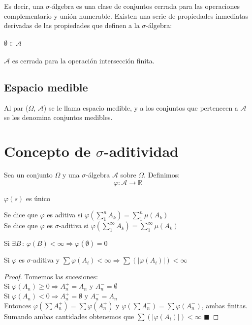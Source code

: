 \documentclass[12pt,a4paper]{book}
\newcommand*{\qed}{\hfill\ensuremath{\blacksquare}}
\begin{document}
Es decir, una $\sigma$-álgebra es una clase de conjuntos cerrada para las operaciones complementario y unión numerable. Existen una serie de propiedades inmediatas derivadas de las propiedades que definen a la $\sigma$-álgebra:\\\\
$\emptyset \in \mathcal{A}$\\\\
$\mathcal{A}$ es cerrada para la operación intersección finita.

\subsection*{Espacio medible}

Al par ($\Omega$, $\mathcal{A}$) se le llama espacio medible, y a los conjuntos que pertenecen a $\mathcal{A}$ se les denomina conjuntos medibles.

\section{Concepto de $\sigma$-aditividad}

Sea un conjunto $\Omega$ y una $\sigma$-álgebra $\mathcal{A}$ sobre $\Omega$. Definimos:
$$\varphi : \mathcal{A} \rightarrow \mathbb{R}$$
\begin{center}
$\varphi (s)$ es único\\
\end{center}
Se dice que $\varphi$ es aditiva si $\varphi(\displaystyle\sum_{1}^{n}A_k)=\displaystyle\sum_1^n\mu(A_k)$\\
Se dice que $\varphi$ es $\sigma$-aditiva si $\varphi(\displaystyle\sum_1^\infty A_k)=\displaystyle\sum_1^\infty \mu(A_k)$\\
\begin{lemma} 
Si $\exists B\, : \, \varphi(B)<\infty \Rightarrow \varphi(\emptyset)=0$
\end{lemma}

\begin{theorem}
Si $\varphi$ es $\sigma$-aditiva y $\displaystyle\sum\varphi(A_i)<\infty\Rightarrow\displaystyle\sum(\vert \varphi(A_i)\vert)<\infty$
\end{theorem}

\begin{proof}
Tomemos las sucesiones: \\
Si $\varphi(A_n)\geq 0 \Longrightarrow A_n^{+}=A_n$ y $A_n^{-}=\emptyset$\\
Si $\varphi(A_n)<0 \Longrightarrow A_n^{+}=\emptyset$ y $A_n^{-}=A_n$\\
Entonces $\varphi(\displaystyle\sum A_n^{+})=\displaystyle\sum\varphi(A_n^{+})$ y $\varphi(\displaystyle\sum A_n^{-})=\displaystyle\sum\varphi(A_n^{-})$, ambas finitas. Sumando ambas cantidades obtenemos que $\displaystyle\sum(\vert \varphi(A_i)\vert)<\infty$
\qed
\end{proof}
\end{document}
